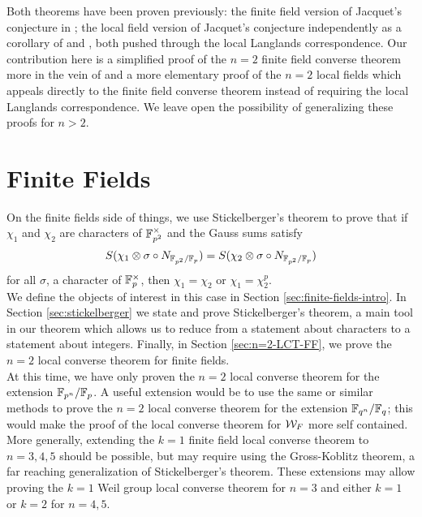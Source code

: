 Both theorems have been proven previously: the finite field version of Jacquet's conjecture in \cite{Nien2014}; the local field version of Jacquet's conjecture independently as a corollary of \cite{Jacquet2017} and \cite{Chai2016}, both pushed through the local Langlands correspondence.
Our contribution here is a simplified proof of the $n=2$ finite field converse theorem more in the vein of \cite{Nien2018} and a more elementary proof of the $n=2$ local fields which appeals directly to the finite field converse theorem instead of requiring the local Langlands correspondence.
We leave open the possibility of generalizing these proofs for $n > 2$.
\\

\section{Finite Fields}
On the finite fields side of things, we use Stickelberger's theorem to prove that if $\chi_1$ and $\chi_2$ are characters of $\mathbb{F}_{p^2}^\times$ and the Gauss sums satisfy
\[S(\chi_1 \otimes \sigma \circ N_{\mathbb{F}_{p^2} / \mathbb{F}_p}) = S(\chi_2 \otimes \sigma \circ N_{\mathbb{F}_{p^2} / \mathbb{F}_p})\]
for all $\sigma$, a character of $\mathbb{F}_p^\times$, then $\chi_1 = \chi_2$ or $\chi_1 = \chi_2^p$.
\\

We define the objects of interest in this case in Section \ref{sec:finite-fields-intro}.
In Section \ref{sec:stickelberger} we state and prove Stickelberger's theorem, a main tool in our theorem which allows us to reduce from a statement about characters to a statement about integers.
Finally, in Section \ref{sec:n=2-LCT-FF}, we prove the $n=2$ local converse theorem for finite fields.
\\

At this time, we have only proven the $n=2$ local converse theorem for the extension $\mathbb{F}_{p^n}/\mathbb{F}_{p}$.
A useful extension would be to use the same or similar methods to prove the $n=2$ local converse theorem for the extension $\mathbb{F}_{q^n}/\mathbb{F}_q$; this would make the proof of the local converse theorem for $\mathcal{W}_F$ more self contained.
More generally, extending the $k = 1$ finite field local converse theorem to $n = 3,4,5$ should be possible, but may require using the Gross-Koblitz theorem, a far reaching generalization of Stickelberger's theorem.
These extensions may allow proving the $k = 1$ Weil group local converse theorem for $n = 3$ and either $k = 1$ or $k =2 $ for $n = 4,5$.
\\

